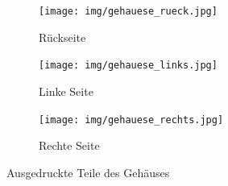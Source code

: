 \par
\begin{figure}[H]
	\centering
	\begin{subfigure}[b]{0.3\linewidth}
		\texttt{[image: img/gehauese\_rueck.jpg]}
		\caption[Rückseite]{Rückseite}
		\label{printet_parts_back}
	\end{subfigure}
	\begin{subfigure}[b]{0.3\linewidth}
		\texttt{[image: img/gehauese\_links.jpg]}
		\caption[Linke Seite]{Linke Seite}
		\label{printet_parts_left}
	\end{subfigure}
	\begin{subfigure}[b]{0.3\linewidth}
		\texttt{[image: img/gehauese\_rechts.jpg]}
		\caption[Rechte Seite]{Rechte Seite}
		\label{printet_parts_right}
	\end{subfigure}
	\caption[Ausgedruckte Teile des Gehäuses]{Ausgedruckte Teile des Gehäuses}
	\label{fig:printet_parts}
\end{figure}
\par
